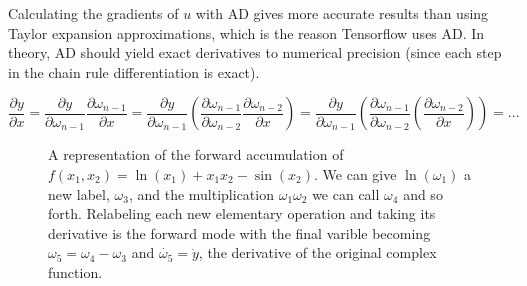 \documentclass[a4paper, twocolumn]{article}
\begin{document}
Calculating the gradients of $u$ with AD gives more accurate results than using Taylor expansion approximations, which is the reason Tensorflow uses AD. In theory, AD should yield exact derivatives to numerical precision (since each step in the chain rule differentiation is exact).

\begin{strip}
\begin{equation} \label{eq:chain}
\frac{\partial y}{\partial x} = \frac{\partial y}{\partial \omega_{n-1}} \frac{\partial \omega_{n-1}}{\partial x} = \frac{\partial y}{\partial \omega_{n-1}} \left( \frac{\partial \omega_{n-1}}{\partial \omega_{n-2}} \frac{\partial \omega_{n-2}}{\partial x} \right) = \frac{\partial y}{\partial \omega_{n-1}} \left( \frac{\partial \omega_{n-1}}{\partial \omega_{n-2}} \left( \frac{\partial \omega_{n-2}}{\partial x} \right) \right) = ...
\end{equation}
\end{strip}


\begin{figure}
\begin{centering}
\caption{A representation of the forward accumulation of $f(x_1, x_2) = \ln (x_1) + x_1 x_2 - \sin (x_2)$. We can give $\ln (\omega_1)$ a new label, $\omega_3$, and the multiplication $\omega_1 \omega_2$ we can call $\omega_4$ and so forth. Relabeling each new elementary operation and taking its derivative is the forward mode with the final varible becoming $\omega_5 = \omega_4 - \omega_3$ and $\dot{\omega_5} = \dot{y}$, the derivative of the original complex function. \label{fig:autodiff}}
\end{centering} 
\end{figure}
\end{document}
